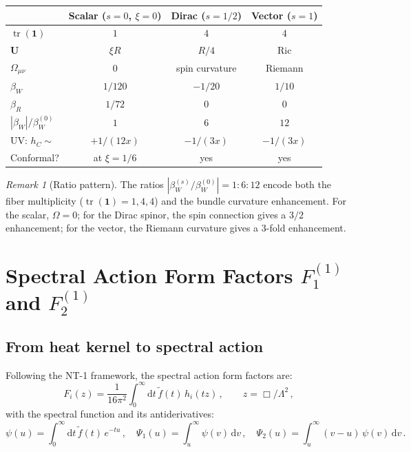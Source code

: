 \documentclass[11pt,a4paper]{article}
\newcommand{\Id}{\mathbf{1}}
\newcommand{\tr}{\operatorname{tr}}
\newcommand{\dd}{\mathrm{d}}
\theoremstyle{definition}
\theoremstyle{remark}
\newtheorem{remark}[theorem]{Remark}
\begin{document}
\begin{center}
\renewcommand{\arraystretch}{1.3}
\begin{tabular}{lccc}
\toprule
& \textbf{Scalar} ($s=0$, $\xi=0$)
& \textbf{Dirac} ($s=1/2$)
& \textbf{Vector} ($s=1$) \\
\midrule
$\tr(\Id)$ & $1$ & $4$ & $4$ \\
$\mathbf{U}$ & $\xi R$ & $R/4$ & $\mathrm{Ric}$ \\
$\Omega_{\mu\nu}$ & $0$ & spin curvature & Riemann \\
$\beta_W$ & $1/120$ & $-1/20$ & $1/10$ \\
$\beta_R$ & $1/72$ & $0$ & $0$ \\
$|\beta_W|/\beta_W^{(0)}$ & $1$ & $6$ & $12$ \\
UV: $h_C \sim$ & $+1/(12x)$ & $-1/(3x)$ & $-1/(3x)$ \\
Conformal? & at $\xi=1/6$ & yes & yes \\
\bottomrule
\end{tabular}
\end{center}

\begin{remark}[Ratio pattern]
The ratios $|\beta_W^{(s)}/\beta_W^{(0)}| = 1 : 6 : 12$ encode
both the fiber multiplicity ($\tr(\Id) = 1, 4, 4$) and the bundle
curvature enhancement.  For the scalar, $\Omega = 0$; for the
Dirac spinor, the spin connection gives a $3/2$ enhancement;
for the vector, the Riemann curvature gives a $3$-fold enhancement.
\end{remark}


\section{Spectral Action Form Factors $F_1^{(1)}$ and $F_2^{(1)}$}
\label{sec:spectral}

\subsection{From heat kernel to spectral action}

Following the NT-1 framework, the spectral action form factors are:
\begin{equation}
  F_i(z) = \frac{1}{16\pi^2}
  \int_0^\infty \dd t\,\tilde{f}(t)\,h_i(tz)\,,
  \qquad z = \Box/\Lambda^2\,,
  \label{eq:Fi-def}
\end{equation}
with the spectral function and its antiderivatives:
\begin{equation}
  \psi(u) = \int_0^\infty \dd t\,\tilde{f}(t)\,e^{-tu}\,,\quad
  \Psi_1(u) = \int_u^\infty \psi(v)\,\dd v\,,\quad
  \Psi_2(u) = \int_u^\infty (v-u)\,\psi(v)\,\dd v\,.
  \label{eq:psi-defs}
\end{equation}
\end{document}
